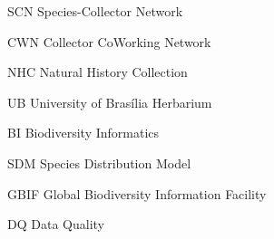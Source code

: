 \documentclass[
	12pt,				%
	openright,			%
	oneside,			%
	a4paper,			%
	sumario=tradicional,%
	french,				%
	spanish,			%
	brazil,				%
    english
	]{abntex2}
\begin{document}
%

%

\listoffigures*
\cleardoublepage

\listoftables*
\cleardoublepage

\begin{siglas}
  \item[SCN] Species-Collector Network
  \item[CWN] Collector CoWorking Network
  \item[NHC] Natural History Collection
  \item[UB] University of Brasília Herbarium
  \item[BI] Biodiversity Informatics
  \item[SDM] Species Distribution Model
  \item[GBIF] Global Biodiversity Information Facility
  \item[DQ] Data Quality
  
\end{siglas}


\tableofcontents*
\cleardoublepage
\end{document}
